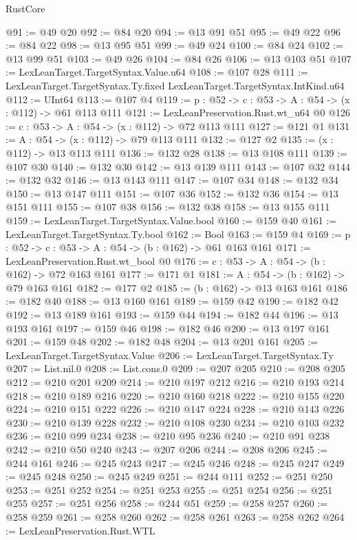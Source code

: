 \begin{lexlean}{RustCore}
\begin{coremodule}
@91 := @49 @20
@92 := @84 @20
@94 := @13 @91 @51
@95 := @49 @22
@96 := @84 @22
@98 := @13 @95 @51
@99 := @49 @24
@100 := @84 @24
@102 := @13 @99 @51
@103 := @49 @26
@104 := @84 @26
@106 := @13 @103 @51
@107 := LexLeanTarget.TargetSyntax.Value.u64
@108 := @107 @28
@111 := LexLeanTarget.TargetSyntax.Ty.fixed LexLeanTarget.TargetSyntax.IntKind.u64
@112 := UInt64
@113 := @107 @4
@119 := {p : @52} -> {c : @53} -> {A : @54} -> (x : @112) -> @61 @113 @111
@121 := LexLeanPreservation.Rust.wt_u64 @0
@126 := {c : @53} -> {A : @54} -> (x : @112) -> @72 @113 @111
@127 := @121 @1
@131 := {A : @54} -> (x : @112) -> @79 @113 @111
@132 := @127 @2
@135 := (x : @112) -> @13 @113 @111
@136 := @132 @28
@138 := @13 @108 @111
@139 := @107 @30
@140 := @132 @30
@142 := @13 @139 @111
@143 := @107 @32
@144 := @132 @32
@146 := @13 @143 @111
@147 := @107 @34
@148 := @132 @34
@150 := @13 @147 @111
@151 := @107 @36
@152 := @132 @36
@154 := @13 @151 @111
@155 := @107 @38
@156 := @132 @38
@158 := @13 @155 @111
@159 := LexLeanTarget.TargetSyntax.Value.bool
@160 := @159 @40
@161 := LexLeanTarget.TargetSyntax.Ty.bool
@162 := Bool
@163 := @159 @4
@169 := {p : @52} -> {c : @53} -> {A : @54} -> (b : @162) -> @61 @163 @161
@171 := LexLeanPreservation.Rust.wt_bool @0
@176 := {c : @53} -> {A : @54} -> (b : @162) -> @72 @163 @161
@177 := @171 @1
@181 := {A : @54} -> (b : @162) -> @79 @163 @161
@182 := @177 @2
@185 := (b : @162) -> @13 @163 @161
@186 := @182 @40
@188 := @13 @160 @161
@189 := @159 @42
@190 := @182 @42
@192 := @13 @189 @161
@193 := @159 @44
@194 := @182 @44
@196 := @13 @193 @161
@197 := @159 @46
@198 := @182 @46
@200 := @13 @197 @161
@201 := @159 @48
@202 := @182 @48
@204 := @13 @201 @161
@205 := LexLeanTarget.TargetSyntax.Value
@206 := LexLeanTarget.TargetSyntax.Ty
@207 := List.nil.{0}
@208 := List.cons.{0}
@209 := @207 @205
@210 := @208 @205
@212 := @210 @201 @209
@214 := @210 @197 @212
@216 := @210 @193 @214
@218 := @210 @189 @216
@220 := @210 @160 @218
@222 := @210 @155 @220
@224 := @210 @151 @222
@226 := @210 @147 @224
@228 := @210 @143 @226
@230 := @210 @139 @228
@232 := @210 @108 @230
@234 := @210 @103 @232
@236 := @210 @99 @234
@238 := @210 @95 @236
@240 := @210 @91 @238
@242 := @210 @50 @240
@243 := @207 @206
@244 := @208 @206
@245 := @244 @161
@246 := @245 @243
@247 := @245 @246
@248 := @245 @247
@249 := @245 @248
@250 := @245 @249
@251 := @244 @111
@252 := @251 @250
@253 := @251 @252
@254 := @251 @253
@255 := @251 @254
@256 := @251 @255
@257 := @251 @256
@258 := @244 @51
@259 := @258 @257
@260 := @258 @259
@261 := @258 @260
@262 := @258 @261
@263 := @258 @262
@264 := LexLeanPreservation.Rust.WTL

\end{coremodule}
\end{lexlean}
